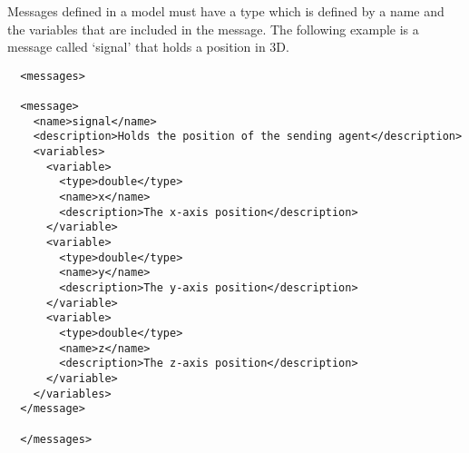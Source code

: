 Messages defined in a model must have a type which is defined by a name and the
variables that are included in the message. The following example is a message
called `signal' that holds a position in 3D.
\clearpage
\begin{verbatim}
  <messages>
  
  <message>
    <name>signal</name>
    <description>Holds the position of the sending agent</description>
    <variables>
      <variable>
        <type>double</type>
        <name>x</name>
        <description>The x-axis position</description>
      </variable>
      <variable>
        <type>double</type>
        <name>y</name>
        <description>The y-axis position</description>
      </variable>
      <variable>
        <type>double</type>
        <name>z</name>
        <description>The z-axis position</description>
      </variable>
    </variables>
  </message>
  
  </messages>
\end{verbatim}
